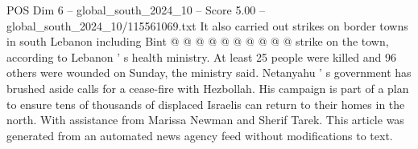 \begin{textsample}{POS Dim 6 – global\_south\_2024\_10 – Score 5.00 – global\_south\_2024\_10/115561069.txt}
It also carried out strikes on border towns in south Lebanon including Bint @ @ @ @ @ @ @ @ @ @ strike on the town, according to Lebanon ' s health ministry.
At least 25 people were killed and 96 others were wounded on Sunday, the ministry said.
Netanyahu ' s government has brushed aside calls for a cease-fire with Hezbollah.
His campaign is part of a plan to ensure tens of thousands of displaced Israelis can return to their homes in the north.
With assistance from Marissa Newman and Sherif Tarek.
This article was generated from an automated news agency feed without modifications to text.

\end{textsample}
